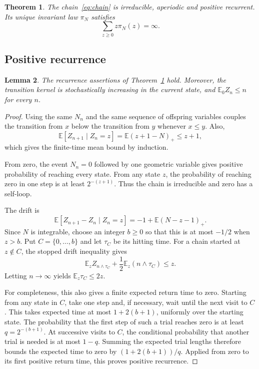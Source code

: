 \documentclass[11pt]{amsart}
\numberwithin{equation}{section}
\newtheorem{theorem}{Theorem}[section]
\newtheorem{lemma}[theorem]{Lemma}
\theoremstyle{remark}
\newcommand{\E}{\mathbb E}
\begin{document}
\begin{theorem}\label{thm:emigration}
The chain~\eqref{eq:chain} is irreducible, aperiodic and positive recurrent. Its unique invariant law $\pi_N$ satisfies
\begin{equation}\label{eq:infinite}
 \sum_{z\ge0}z\pi_N(z)=\infty.
\end{equation}
\end{theorem}

\subsection{Positive recurrence}

\begin{lemma}\label{lem:recurrence}
The recurrence assertions of Theorem~\ref{thm:emigration} hold. Moreover, the transition kernel is stochastically increasing in the current state, and $\E_0Z_n\le n$ for every $n$.
\end{lemma}

\begin{proof}
Using the same $N_n$ and the same sequence of offspring variables couples the transition from $x$ below the transition from $y$ whenever $x\le y$. Also,
\[
 \E[Z_{n+1}\mid Z_n=z]=\E(z+1-N)_+\le z+1,
\]
which gives the finite-time mean bound by induction.

From zero, the event $N_n=0$ followed by one geometric variable gives positive probability of reaching every state. From any state $z$, the probability of reaching zero in one step is at least $2^{-(z+1)}$. Thus the chain is irreducible and zero has a self-loop.

The drift is
\begin{equation}\label{eq:drift}
 \E[Z_{n+1}-Z_n\mid Z_n=z]
 =-1+\E(N-z-1)_+.
\end{equation}
Since $N$ is integrable, choose an integer $b\ge0$ so that this is at most $-1/2$ when $z>b$. Put $C=\{0,\ldots,b\}$ and let $\tau_C$ be its hitting time. For a chain started at $z\notin C$, the stopped drift inequality gives
\[
 \E_z Z_{n\wedge\tau_C}+\frac12\E_z(n\wedge\tau_C)\le z.
\]
Letting $n\to\infty$ yields $\E_z\tau_C\le2z$.

For completeness, this also gives a finite expected return time to zero. Starting from any state in $C$, take one step and, if necessary, wait until the next visit to $C$. This takes expected time at most $1+2(b+1)$, uniformly over the starting state. The probability that the first step of such a trial reaches zero is at least $q=2^{-(b+1)}$. At successive visits to $C$, the conditional probability that another trial is needed is at most $1-q$. Summing the expected trial lengths therefore bounds the expected time to zero by $(1+2(b+1))/q$. Applied from zero to its first positive return time, this proves positive recurrence.
\end{proof}
\end{document}
